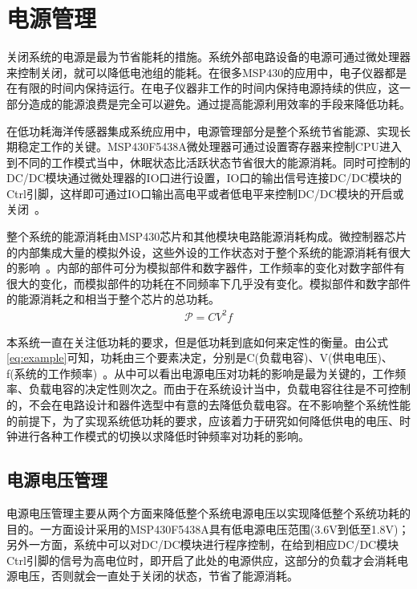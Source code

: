 \section{电源管理}
关闭系统的电源是最为节省能耗的措施。系统外部电路设备的电源可通过微处理器来控制关闭，就可以降低电池组的能耗。在很多MSP430的应用中，电子仪器都是在有限的时间内保持运行。在电子仪器非工作的时间内保持电源持续的供应，这一部分造成的能源浪费是完全可以避免。通过提高能源利用效率的手段来降低功耗。

在低功耗海洋传感器集成系统应用中，电源管理部分是整个系统节省能源、实现长期稳定工作的关键。MSP430F5438A微处理器可通过设置寄存器来控制CPU进入到不同的工作模式当中，休眠状态比活跃状态节省很大的能源消耗。同时可控制的DC/DC模块通过微处理器的IO口进行设置，IO口的输出信号连接DC/DC模块的Ctrl引脚，这样即可通过IO口输出高电平或者低电平来控制DC/DC模块的开启或关闭~\cite{2013xyd}。

整个系统的能源消耗由MSP430芯片和其他模块电路能源消耗构成。微控制器芯片的内部集成大量的模拟外设，这些外设的工作状态对于整个系统的能源消耗有很大的影响~\cite{2005xy}。内部的部件可分为模拟部件和数字器件，工作频率的变化对数字部件有很大的变化，而模拟部件的功耗在不同频率下几乎没有变化。模拟部件和数字部件的能源消耗之和相当于整个芯片的总功耗。
\begin{equation}
\begin{split}
\mathcal{P} = CV^2f
\end{split}
\label{eq:example}
\end{equation}   

本系统一直在关注低功耗的要求，但是低功耗到底如何来定性的衡量。由公式\ref{eq:example}可知，功耗由三个要素决定，分别是C(负载电容)、V(供电电压)、f(系统的工作频率)~\cite{2007hsj}。从中可以看出电源电压对功耗的影响是最为关键的，工作频率、负载电容的决定性则次之。而由于在系统设计当中，负载电容往往是不可控制的，不会在电路设计和器件选型中有意的去降低负载电容。在不影响整个系统性能的前提下，为了实现系统低功耗的要求，应该着力于研究如何降低供电的电压、时钟进行各种工作模式的切换以求降低时钟频率对功耗的影响。

\subsection{电源电压管理}
电源电压管理主要从两个方面来降低整个系统电源电压以实现降低整个系统功耗的目的。一方面设计采用的MSP430F5438A具有低电源电压范围(3.6V到低至1.8V)；另外一方面，系统中可以对DC/DC模块进行程序控制，在给到相应DC/DC模块Ctrl引脚的信号为高电位时，即开启了此处的电源供应，这部分的负载才会消耗电源电压，否则就会一直处于关闭的状态，节省了能源消耗。

